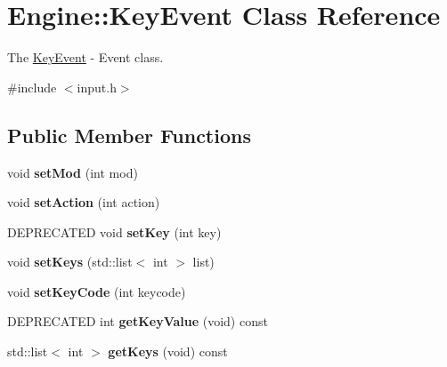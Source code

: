 \hypertarget{classEngine_1_1KeyEvent}{}\section{Engine\+:\+:Key\+Event Class Reference}
\label{classEngine_1_1KeyEvent}


The \hyperlink{classEngine_1_1KeyEvent}{Key\+Event} -\/ Event class.  




{\ttfamily \#include $<$input.\+h$>$}

\subsection*{Public Member Functions}
\begin{DoxyCompactItemize}
\item 
\hypertarget{classEngine_1_1KeyEvent_ae137e8b600086dc86e4ca455527b16e8}{}void {\bfseries set\+Mod} (int mod)\label{classEngine_1_1KeyEvent_ae137e8b600086dc86e4ca455527b16e8}

\item 
\hypertarget{classEngine_1_1KeyEvent_a155cb548dc24ca5c77996af255cb6758}{}void {\bfseries set\+Action} (int action)\label{classEngine_1_1KeyEvent_a155cb548dc24ca5c77996af255cb6758}

\item 
\hypertarget{classEngine_1_1KeyEvent_ae6947367a0439c1e5510d5f2a238a5d4}{}D\+E\+P\+R\+E\+C\+A\+T\+E\+D void {\bfseries set\+Key} (int key)\label{classEngine_1_1KeyEvent_ae6947367a0439c1e5510d5f2a238a5d4}

\item 
\hypertarget{classEngine_1_1KeyEvent_a3fd139074a8b8551ecacc6b2d0399df3}{}void {\bfseries set\+Keys} (std\+::list$<$ int $>$ list)\label{classEngine_1_1KeyEvent_a3fd139074a8b8551ecacc6b2d0399df3}

\item 
\hypertarget{classEngine_1_1KeyEvent_a138ad60c2a84d262f1d91c9cadd1c460}{}void {\bfseries set\+Key\+Code} (int keycode)\label{classEngine_1_1KeyEvent_a138ad60c2a84d262f1d91c9cadd1c460}

\item 
\hypertarget{classEngine_1_1KeyEvent_a615380b6cedad4b9bc3b92f48796e02a}{}D\+E\+P\+R\+E\+C\+A\+T\+E\+D int {\bfseries get\+Key\+Value} (void) const \label{classEngine_1_1KeyEvent_a615380b6cedad4b9bc3b92f48796e02a}

\item 
\hypertarget{classEngine_1_1KeyEvent_ae5857d3b1778eb9190a4a84d31089d3f}{}std\+::list$<$ int $>$ {\bfseries get\+Keys} (void) const \label{classEngine_1_1KeyEvent_ae5857d3b1778eb9190a4a84d31089d3f}


\end{DoxyCompactItemize}
